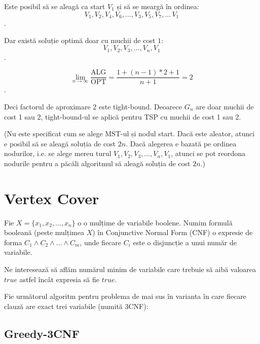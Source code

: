 \documentclass[a4paper,12pt]{article}
\newcommand*{\OPT}{\text{OPT}}
\newcommand*{\ALG}{\text{ALG}}
\begin{document}
\begin{enumerate}
\begin{enumerate}
                        Este posibil să se aleagă ca start $V_1$ și să se meargă în ordinea:
                        \[V_1, V_2, V_4, V_6, \dots, V_3, V_5, V_7, \dots\, V_1\].

                        Dar există soluție optimă doar cu muchii de cost $1$: \[V_1, V_2, V_3, \dots, V_n, V_1\].

                        \[\lim_{n \to \infty} \frac{\ALG}{\OPT} = \frac{1 + (n - 1) * 2 + 1}{n + 1} = 2\].

                        Deci factorul de aproximare 2 este tight-bound.
                        Deoarece $G_n$ are doar muchii de cost 1 sau 2, tight-bound-ul se aplică pentru
                        TSP cu muchii de cost 1 sau 2.

                        (Nu este specificat cum se alege MST-ul și nodul start.
                        Dacă este aleator, atunci e posibil să se aleagă soluția de cost $2n$.
                        Dacă alegerea e bazată pe ordinea nodurilor, i.e. se alege mereu turul
                        $V_1, V_2, V_3, \dots, V_n, V_1$, atunci se pot reordona nodurile pentru
                        a păcăli algoritmul să aleagă soluția de cost $2n$.)

            \end{enumerate}

\end{enumerate}

\section{Vertex Cover}

Fie $X = \{x_1, x_2, \dots, x_n\}$ o o mulțime de variabile boolene. Numim formulă
booleană (peste mulțimea $X$) în Conjunctive Normal Form (CNF) o
expresie de forma $C_1 \land C_2 \land \dots \land C_m$, unde fiecare $C_i$ este
o disjuncție a unui număr de variabile.

Ne interesează să aflăm numărul minim de variabile care trebuie să aibă valoarea
$true$ astfel încât expresia să fie $true$.

Fie următorul algoritm pentru problema de mai sus în varianta în
care fiecare clauză are exact trei variabile (numită 3CNF):

\subsection{Greedy-3CNF}
\end{document}

